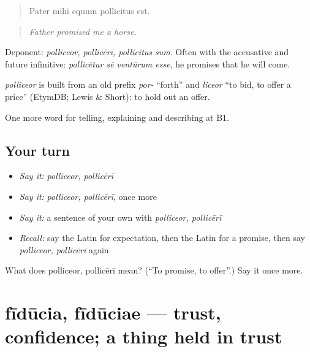 \begin{quote}
Pater mihi equum pollicitus est.
\end{quote}

\begin{quote}
\emph{Father promised me a horse.}
\end{quote}

Deponent: \emph{polliceor, pollicērī, pollicitus sum}. Often with the accusative and future infinitive: \emph{pollicētur sē ventūrum esse}, he promises that he will come.

\begin{cousinweb}
\emph{polliceor} is built from an old prefix \emph{por-} \textquotedblleft{}forth\textquotedblright{} and \emph{liceor} \textquotedblleft{}to bid, to offer a price\textquotedblright{} (EtymDB; Lewis \& Short): to hold out an offer.
\end{cousinweb}

\begin{grammarlens}[title={What you've built}]
One more word for telling, explaining and describing at B1.
\end{grammarlens}

\subsection*{Your turn}
\begin{itemize}
\raggedright
  \item \emph{Say it:} \emph{polliceor, pollicērī}
  \item \emph{Say it:} \emph{polliceor, pollicērī}, once more
  \item \emph{Say it:} a sentence of your own with \emph{polliceor, pollicērī}
  \item \emph{Recall:} say the Latin for expectation, then the Latin for a promise, then say \emph{polliceor, pollicērī} again
\end{itemize}

\begin{tcolorbox}[breakable,colback=teal!4,colframe=teal!35!black,title={Before you move on}]
What does polliceor, pollicērī mean? (\textquotedblleft{}To promise, to offer\textquotedblright{}.) Say it once more.
\end{tcolorbox}
\section[fīdūcia, fīdūciae]{fīdūcia, fīdūciae — trust, confidence; a thing held in trust}

